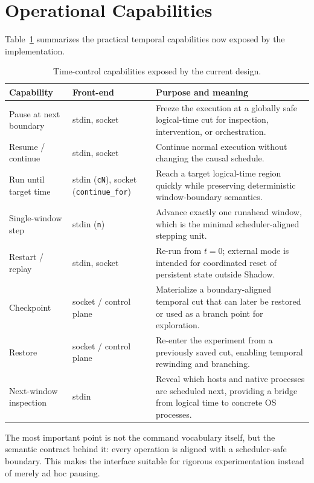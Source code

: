 \documentclass[11pt,a4paper]{article}
\begin{document}
\section{Operational Capabilities}

Table~\ref{tab:capabilities} summarizes the practical temporal capabilities
now exposed by the implementation.

\begin{table}[h]
\centering
\begin{tabular}{@{}p{3.1cm}p{3.2cm}p{7.1cm}@{}}
\toprule
\textbf{Capability} & \textbf{Front-end} & \textbf{Purpose and meaning} \\
\midrule
Pause at next boundary & stdin, socket & Freeze the execution at a globally safe logical-time cut for inspection, intervention, or orchestration. \\
Resume / continue & stdin, socket & Continue normal execution without changing the causal schedule. \\
Run until target time & stdin (\texttt{cN}), socket (\texttt{continue\_for}) & Reach a target logical-time region quickly while preserving deterministic window-boundary semantics. \\
Single-window step & stdin (\texttt{n}) & Advance exactly one runahead window, which is the minimal scheduler-aligned stepping unit. \\
Restart / replay & stdin, socket & Re-run from \(t=0\); external mode is intended for coordinated reset of persistent state outside Shadow. \\
Checkpoint & socket / control plane & Materialize a boundary-aligned temporal cut that can later be restored or used as a branch point for exploration. \\
Restore & socket / control plane & Re-enter the experiment from a previously saved cut, enabling temporal rewinding and branching. \\
Next-window inspection & stdin & Reveal which hosts and native processes are scheduled next, providing a bridge from logical time to concrete OS processes. \\
\bottomrule
\end{tabular}
\caption{Time-control capabilities exposed by the current design.}
\label{tab:capabilities}
\end{table}

The most important point is not the command vocabulary itself, but the
semantic contract behind it: every operation is aligned with a scheduler-safe
boundary. This makes the interface suitable for rigorous experimentation
instead of merely ad hoc pausing.
\end{document}
